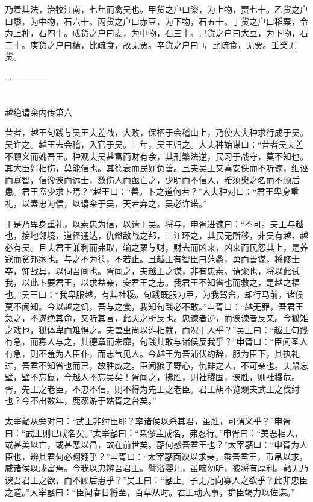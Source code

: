 \documentclass[12pt,UTF8]{ctexbook}
\begin{document}
乃着其法，治牧江南，七年而禽吴也。甲货之户曰粢，为上物，贾七十。乙货之户曰黍，为中物，石六十。丙货之户曰赤豆，为下物，石五十。丁货之户曰稻粟，令为上种，石四十。成货之户曰麦，为中物，石三十。己货之户曰大豆，为下物，石二十。庚货之户曰穬，比疏食，故无贾。辛货之户曰□，比疏食，无贾。壬癸无货。

...
------------

\part{}

越绝请籴内传第六

昔者，越王句践与吴王夫差战，大败，保栖于会稽山上，乃使大夫种求行成于吴。吴许之。越王去会稽，入官于吴。三年，吴王归之。大夫种始谋曰：“昔者吴夫差不顾义而媿吾王。种观夫吴甚富而财有余，其刑繁法逆，民习于战守，莫不知也。其大臣好相伤，莫能信也。其德衰而民好负善。且夫吴王又喜安佚而不听谏，细诬而寡智，信谗谀而远士，数伤人而亟亡之，少明而不信人，希须臾之名而不顾后患。君王盍少求卜焉？”越王曰：“善。卜之道何若？”大夫种对曰：“君王卑身重礼，以素忠为信，以请籴于吴，天若弃之，吴必许诺。”

于是乃卑身重礼，以素忠为信，以请于吴。将与，申胥进谏曰：“不可。夫王与越也，接地邻境，道径通达，仇雠敌战之邦，三江环之，其民无所移，非吴有越，越必有吴。且夫君王兼利而弗取，输之粟与财，财去而凶来，凶来而民怨其上，是养寇而贫邦家也。与之不为德，不若止。且越王有智臣曰范蠡，勇而善谋，将修士卒，饰战具，以伺吾间也。胥闻之，夫越王之谋，非有忠素。请籴也，将以此试我，以此卜要君王，以求益亲，安君王之志。我君王不知省也而救之，是越之福也。”吴王曰：“我卑服越，有其社稷。句践既服为臣，为我驾舍，却行马前，诸侯莫不闻知。今以越之饥，吾与之食，我知句践必不敢。”申胥曰：“越无罪，吾君王急之，不遂绝其命，又听其言，此天之所反也。忠谏者逆，而谀谏者反亲。今狐雉之戏也，狐体卑而雉惧之。夫兽虫尚以诈相就，而况于人乎？”吴王曰：“越王句践有急，而寡人与之，其德章而未靡，句践其敢与诸侯反我乎？”申胥曰：“臣闻圣人有急，则不羞为人臣仆，而志气见人。今越王为吾浦伏约辞，服为臣下，其执礼过，吾君不知省也而已，故胜威之。臣闻狼子野心，仇雠之人，不可亲也。夫鼠忘壁，壁不忘鼠，今越人不忘吴矣！胥闻之，拂胜，则社稷固，谀胜，则社稷危。胥，先王之老臣，不忠不信，则不得为先王之老臣。君王胡不览观夫武王之伐纣也？今不出数年，鹿豕游于姑胥之台矣。”

太宰嚭从旁对曰：“武王非纣臣耶？率诸侯以杀其君，虽胜，可谓义乎？”申胥曰：“武王则已成名矣。”太宰嚭曰：“亲僇主成名，弗忍行。”申胥曰：“美恶相入，或甚美以亡，或甚恶以昌，故在前世矣。嚭何惑吾君王也？”太宰嚭曰：“申胥为人臣也，辨其君何必翙翙乎？”申胥曰：“太宰嚭面谀以求亲，乘吾君王，币帛以求，威诸侯以成富焉。今我以忠辨吾君王。譬浴婴儿，虽啼勿听，彼将有厚利。嚭无乃谀吾君王之欲，而不顾后患乎？”吴王曰：“嚭止。子无乃向寡人之欲乎？此非忠臣之道。”大宰嚭曰：“臣闻春日将至，百草从时。君王动大事，群臣竭力以佐谋。”
\end{document}

